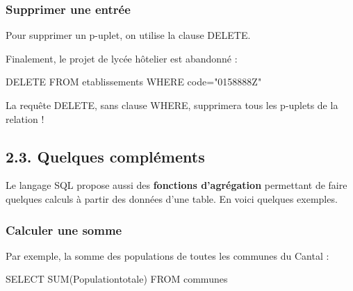 \documentclass[
  a4paper,
  DIV=11,
  numbers=noendperiod]{scrartcl}
\newenvironment{Shaded}{\begin{snugshade}}{\end{snugshade}}
\newcommand{\FunctionTok}[1]{\textcolor[rgb]{0.28,0.35,0.67}{#1}}
\newcommand{\KeywordTok}[1]{\textcolor[rgb]{0.00,0.23,0.31}{#1}}
\newcommand{\NormalTok}[1]{\textcolor[rgb]{0.00,0.23,0.31}{#1}}
\newcommand{\OperatorTok}[1]{\textcolor[rgb]{0.37,0.37,0.37}{#1}}
\newcommand{\OtherTok}[1]{\textcolor[rgb]{0.00,0.23,0.31}{#1}}
\begin{document}
\hypertarget{supprimer-une-entruxe9e}{%
\subsubsection{Supprimer une entrée}\label{supprimer-une-entruxe9e}}

Pour supprimer un p-uplet, on utilise la clause DELETE.

Finalement, le projet de lycée hôtelier est abandonné :

\begin{Shaded}
\begin{Highlighting}[]
\KeywordTok{DELETE} \KeywordTok{FROM}\NormalTok{ etablissements}
\KeywordTok{WHERE}\NormalTok{ code}\OperatorTok{=}\OtherTok{"0158888Z"}
\end{Highlighting}
\end{Shaded}

\begin{tcolorbox}[enhanced jigsaw, toprule=.15mm, colbacktitle=quarto-callout-warning-color!10!white, opacityback=0, opacitybacktitle=0.6, arc=.35mm, colback=white, rightrule=.15mm, bottomtitle=1mm, bottomrule=.15mm, title=\textcolor{quarto-callout-warning-color}{\faExclamationTriangle}\hspace{0.5em}{Attention !}, toptitle=1mm, titlerule=0mm, leftrule=.75mm, coltitle=black, left=2mm, breakable]

La requête DELETE, sans clause WHERE, supprimera tous les p-uplets de la
relation !

\end{tcolorbox}

\hypertarget{quelques-compluxe9ments}{%
\subsection{2.3. Quelques compléments}\label{quelques-compluxe9ments}}

Le langage SQL propose aussi des \textbf{fonctions d'agrégation}
permettant de faire quelques calculs à partir des données d'une table.
En voici quelques exemples.

\hypertarget{calculer-une-somme}{%
\subsubsection{Calculer une somme}\label{calculer-une-somme}}

Par exemple, la somme des populations de toutes les communes du Cantal :

\begin{Shaded}
\begin{Highlighting}[]
\KeywordTok{SELECT} \FunctionTok{SUM}\NormalTok{(Populationtotale)}
\KeywordTok{FROM}\NormalTok{ communes}
\end{Highlighting}
\end{Shaded}
\end{document}
